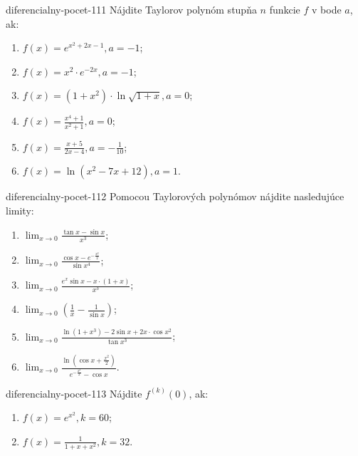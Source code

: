 \begin{defproblem}{diferencialny-pocet-111}
Nájdite Taylorov polynóm stupňa $n$ funkcie $f$ v bode $a$, ak:
\begin{multicols}{2}
\begin{enumerate}
    \item $f(x)=e^{x^2+2x-1},a=-1$;
	\item $f(x)=x^2\cdot e^{-2x},a=-1$;
	\item $f(x)=(1+x^2)\cdot\ln\sqrt{1+x},a=0$;
	\item $f(x)=\frac{x^4+1}{x^2+1},a=0$;
	\item $f(x)=\frac{x+5}{2x-4},a=-\frac{1}{10}$;
	\item $f(x)=\ln (x^2-7x+12),a=1$.
\end{enumerate}
\end{multicols}
\end{defproblem}

\begin{defproblem}{diferencialny-pocet-112}
Pomocou Taylorových polynómov nájdite nasledujúce limity:
\begin{multicols}{2}
\begin{enumerate}
    \item $\lim_{x\rightarrow 0}\frac{\tan x-\sin x}{x^3}$;
	\item $\lim_{x\rightarrow 0}\frac{\cos x-e^{-\frac{x^2}{2}}}{\sin x^4}$;
	\item $\lim_{x\rightarrow 0}\frac{e^x\sin x-x\cdot(1+x)}{x^3}$;
	\item $\lim_{x\rightarrow 0}(\frac{1}{x}-\frac{1}{\sin x})$;
	\item $\lim_{x\rightarrow 0}\frac{\ln (1+x^3)-2\sin x+2x\cdot\cos x^2}{\tan x^3}$;
	\item $\lim_{x\rightarrow 0}\frac{\ln (\cos x +\frac{x^2}{2})}{e^{-\frac{x^2}{2}}-\cos x}$.
\end{enumerate}
\end{multicols}
\end{defproblem}

\begin{defproblem}{diferencialny-pocet-113}
Nájdite $f^{(k)}(0)$, ak:
\begin{multicols}{2}
\begin{enumerate}
    \item $f(x)=e^{x^2},k=60$;
	\item $f(x)=\frac{1}{1+x+x^2},k=32$.
\end{enumerate}
\end{multicols}
\end{defproblem}

